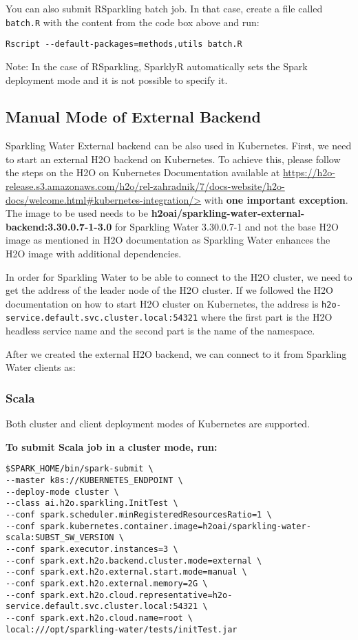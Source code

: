 You can also submit RSparkling batch job. In that case, create a file called \texttt{batch.R} with the content
from the code box above and run:

\begin{lstlisting}[style=Bash]
Rscript --default-packages=methods,utils batch.R
\end{lstlisting}

Note: In the case of RSparkling, SparklyR automatically sets the Spark deployment mode and it is not possible to specify it.

\subsection{Manual Mode of External Backend}

Sparkling Water External backend can be also used in Kubernetes. First, we need to start
an external H2O backend on Kubernetes. To achieve this, please follow the steps on the
H2O on Kubernetes Documentation available at \url{https://h2o-release.s3.amazonaws.com/h2o/rel-zahradnik/7/docs-website/h2o-docs/welcome.html#kubernetes-integration/>} with
\textbf{one important exception}. The image to be used needs to be \textbf{h2oai/sparkling-water-external-backend:3.30.0.7-1-3.0} for Sparkling Water 3.30.0.7-1 and
not the base H2O image as mentioned in H2O documentation as Sparkling Water enhances the H2O image with additional dependencies.

In order for Sparkling Water to be able to connect to the H2O cluster, we need to get the address of the leader node
of the H2O cluster. If we followed the H2O documentation on how to start H2O cluster on Kubernetes, the address is
\texttt{h2o-service.default.svc.cluster.local:54321} where the first part is the H2O headless service name and the
second part is the name of the namespace.

After we created the external H2O backend, we can connect to it from Sparkling Water clients as:

\subsubsection{Scala}

Both cluster and client deployment modes of Kubernetes are supported.

\textbf{To submit Scala job in a cluster mode, run:}

\begin{lstlisting}[style=Bash]
$SPARK_HOME/bin/spark-submit \
--master k8s://KUBERNETES_ENDPOINT \
--deploy-mode cluster \
--class ai.h2o.sparkling.InitTest \
--conf spark.scheduler.minRegisteredResourcesRatio=1 \
--conf spark.kubernetes.container.image=h2oai/sparkling-water-scala:SUBST_SW_VERSION \
--conf spark.executor.instances=3 \
--conf spark.ext.h2o.backend.cluster.mode=external \
--conf spark.ext.h2o.external.start.mode=manual \
--conf spark.ext.h2o.external.memory=2G \
--conf spark.ext.h2o.cloud.representative=h2o-service.default.svc.cluster.local:54321 \
--conf spark.ext.h2o.cloud.name=root \
local:///opt/sparkling-water/tests/initTest.jar
\end{lstlisting}

